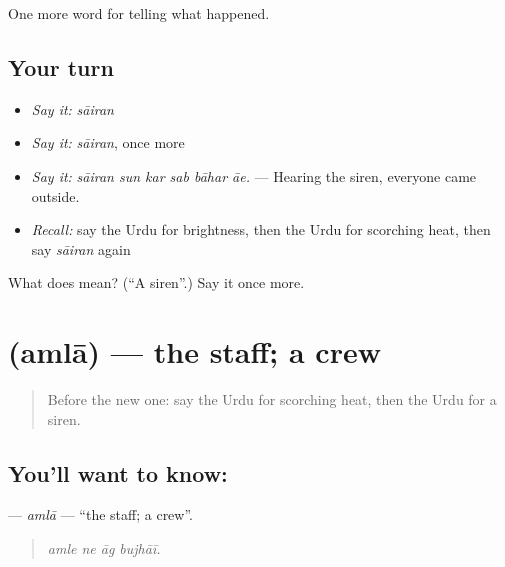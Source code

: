 \begin{grammarlens}[title={What you've built}]
One more word for telling what happened.
\end{grammarlens}

\subsection*{Your turn}
\begin{itemize}
\raggedright
  \item \emph{Say it:} \emph{sāiran}
  \item \emph{Say it:} \emph{sāiran}, once more
  \item \emph{Say it:} \emph{sāiran sun kar sab bāhar āe.} — Hearing the siren, everyone came outside.
  \item \emph{Recall:} say the Urdu for brightness, then the Urdu for scorching heat, then say \emph{sāiran} again
\end{itemize}

\begin{tcolorbox}[breakable,colback=teal!4,colframe=teal!35!black,title={Before you move on}]
What does  mean? (\textquotedblleft{}A siren\textquotedblright{}.) Say it once more.
\end{tcolorbox}
\section[\texorpdfstring{\ur{عملہ} (amlā)}{عملہ (amlā)}]{ (amlā) — the staff; a crew}

\label{lesson:UR-C289-amla}



\begin{quote}
Before the new one: say the Urdu for scorching heat, then the Urdu for a siren.
\end{quote}

\subsection*{You'll want to know: }
\textbf{} — \emph{amlā} — \textquotedblleft{}the staff; a crew\textquotedblright{}.

\begin{quote}
   
\end{quote}

\begin{quote}
\emph{amle ne āg bujhāī.}
\end{quote}

